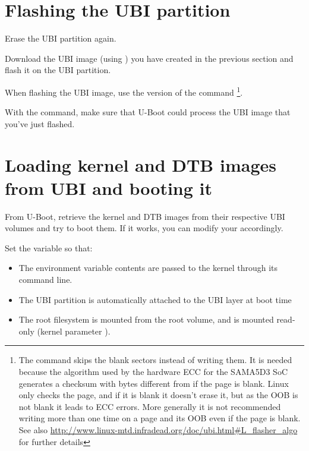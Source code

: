 %
%
%

\section{Flashing the UBI partition}

Erase the UBI partition again.

Download the UBI image (using ) you have created in the
previous section and flash it on the UBI partition.

When flashing the UBI image, use the  version of the
command \footnote{The command  skips
  the blank sectors instead of writing them. It is needed because the
  algorithm used by the hardware ECC for the SAMA5D3 SoC generates a
  checksum with bytes different from  if the page is blank. Linux
  only checks the page, and if it is blank it doesn't erase it, but as
  the OOB is not blank it leads to ECC errors. More generally it is
  not recommended writing more than one time on a page and its OOB
  even if the page is blank. See also
  \url{http://www.linux-mtd.infradead.org/doc/ubi.html\#L_flasher_algo} for
  further details}.

With the  command, make sure that U-Boot could process
the UBI image that you've just flashed.

\section{Loading kernel and DTB images from UBI and booting it}

From U-Boot, retrieve the kernel and DTB images from their respective
UBI volumes and try to boot them. If it works, you can modify your
 accordingly.

Set the  variable so that:

\begin{itemize}
\item The  environment variable contents are passed to
  the kernel through its command line.
\item The UBI partition is automatically attached to the UBI layer at
  boot time
\item The root filesystem is mounted from the root volume, and is mounted
  read-only (kernel parameter ).
\end{itemize}

